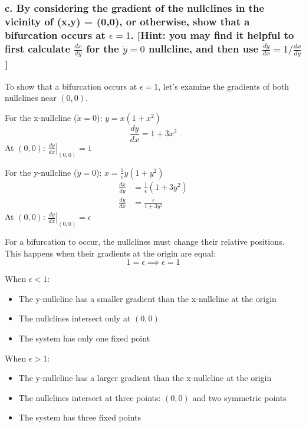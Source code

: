 \documentclass[12pt]{article}
\begin{document}
\newpage
\subsubsection*{c. By considering the gradient of the nullclines in the vicinity of (x,y) = (0,0), or otherwise, show that a
    bifurcation occurs at $\epsilon = 1$. [Hint: you may find it helpful to first calculate $\frac{dx}{dy}$ for the $\dot{y} = 0$ nullcline, and
            then use $\frac{dy}{dx} = 1/\frac{dx}{dy}$]}

To show that a bifurcation occurs at $\epsilon = 1$, let's examine the
gradients of both nullclines near $(0,0)$.

For the x-nullcline ($\dot{x} = 0$): $y = x(1 + x^2)$
\begin{equation*}
    \frac{dy}{dx} = 1 + 3x^2
\end{equation*}
At $(0,0)$: $\left.\frac{dy}{dx}\right|_{(0,0)} = 1$

For the y-nullcline ($\dot{y} = 0$): $x = \frac{1}{\epsilon}y(1 + y^2)$
\begin{align*}
    \frac{dx}{dy} & = \frac{1}{\epsilon}(1 + 3y^2) \\
    \frac{dy}{dx} & = \frac{\epsilon}{1 + 3y^2}
\end{align*}
At $(0,0)$: $\left.\frac{dy}{dx}\right|_{(0,0)} = \epsilon$

For a bifurcation to occur, the nullclines must change their relative
positions. This happens when their gradients at the origin are equal:
\begin{equation*}
    1 = \epsilon \implies \epsilon = 1
\end{equation*}

When $\epsilon < 1$:
\begin{itemize}
    \item The y-nullcline has a smaller gradient than the x-nullcline at the origin
    \item The nullclines intersect only at $(0,0)$
    \item The system has only one fixed point
\end{itemize}

When $\epsilon > 1$:
\begin{itemize}
    \item The y-nullcline has a larger gradient than the x-nullcline at the origin
    \item The nullclines intersect at three points: $(0,0)$ and two symmetric points
    \item The system has three fixed points
\end{itemize}
\end{document}
